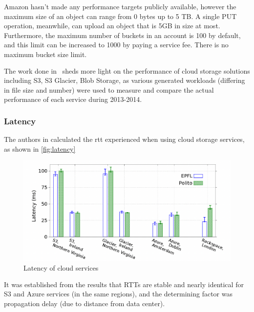 Amazon hasn't made any performance targets publicly available, however the maximum size of an object can range from 0 bytes up to 5 TB. A single PUT operation, meanwhile, can upload an object that is 5GB in size at most. Furthermore, the maximum number of buckets in an account is 100 by default, and this limit can be increased to 1000 by paying a service fee. There is no maximum bucket size limit.~\cite{s3faq, s3_limits}

The work done in~\cite{s3vsblob_performance} sheds more light on the performance of cloud storage solutions including S3, S3 Glacier, Blob Storage, as various generated workloads (differing in file size and number) were used to measure and compare the actual performance of each service during 2013-2014.

\subsubsection{Latency}
The authors in \cite{s3vsblob_performance} calculated the \ac{rtt} experienced when using cloud storage services, as shown in \autoref{fig:latency}
\begin{figure} [h]
    \centering
    \includegraphics[scale=0.7]{images/latency}
    \caption{\label{fig:latency}Latency of cloud services}
\end{figure}


It was established from the results that RTTs are stable and nearly identical for S3 and Azure services (in the same regions), and the determining factor was propagation delay (due to distance from data center).

